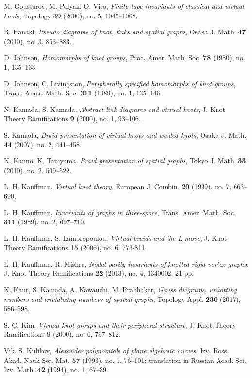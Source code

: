 \documentclass[11 pt, reqno]{amsart}
\theoremstyle{definition}
\numberwithin{equation}{subsection}
\begin{document}
\begin{thebibliography}{HD}
M. Goussarov, M. Polyak, O. Viro, \textit{Finite-type invariants of classical and virtual knots}, Topology \textbf{39} (2000), no. 5, 1045--1068.

R. Hanaki, \textit{Pseudo diagrams of knot, links and spatial graphs}, Osaka J. Math. \textbf{47} (2010), no. 3, 863--883.

D. Johnson, \textit{Homomorphs of knot groups}, Proc. Amer. Math. Soc. \textbf{78} (1980), no. 1, 135--138.

D. Johnson, C. Livingston, \textit{Peripherally specified homomorphs of knot groups}, Trans. Amer. Math. Soc. \textbf{311} (1989), no. 1, 135--146.

N. Kamada, S. Kamada, \textit{Abstract link diagrams and virtual knots}, J. Knot Theory Ramifications \textbf{9} (2000), no. 1, 93--106.

S. Kamada, \textit{Braid presentation of virtual knots and welded knots}, Osaka J. Math. \textbf{44} (2007), no. 2, 441--458.

K. Kanno, K. Taniyama, \textit{Braid presentation of spatial graphs}, Tokyo J. Math. \textbf{33} (2010), no. 2, 509--522.

L. H. Kauffman, \textit{Virtual knot theory}, European J. Combin. \textbf{20} (1999), no. 7, 663--690.

L. H. Kauffman, \textit{Invariants of graphs in three-space}, Trans. Amer. Math. Soc. \textbf{311} (1989), no. 2, 697--710.

L. H. Kauffman, S. Lambropoulou, \textit{Virtual braids and the L-move}, J. Knot Theory Ramifications \textbf{15} (2006), no. 6, 773-811.

L. H. Kauffman, R. Mishra, \textit{Nodal parity invariants of knotted rigid vertex graphs}, J. Knot Theory Ramifications \textbf{22} (2013), no. 4, 1340002, 21 pp.

K. Kaur, S. Kamada, A. Kawauchi, M. Prabhakar, \textit{Gauss diagrams, unkotting numbers and trivializing numbers of spatial graphs}, Topology Appl. \textbf{230} (2017), 586--598.


S. G. Kim, \textit{Virtual knot groups and their peripheral structure}, J. Knot Theory Ramifications \textbf{9} (2000), no. 6, 797--812.

Vik. S. Kulikov, \textit{Alexander polynomials of plane algebraic curves}, Izv. Ross. Akad. Nauk Ser. Mat. \textbf{57} (1993), no. 1, 76--101; translation in Russian Acad. Sci. Izv. Math. \textbf{42} (1994), no. 1, 67--89.


\end{thebibliography}
\end{document}
